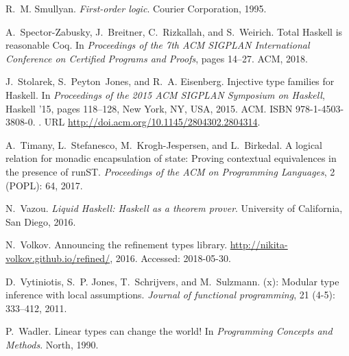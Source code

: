 \documentclass[format=sigplan, review=false, screen=true, 10pt]{acmart}
\begin{document}
\begin{thebibliography}{22}
R.~M. Smullyan.
\newblock \emph{First-order logic}.
\newblock Courier Corporation, 1995.



A.~Spector-Zabusky, J.~Breitner, C.~Rizkallah, and S.~Weirich.
\newblock Total {Haskell} is reasonable {Coq}.
\newblock In \emph{Proceedings of the 7th ACM SIGPLAN International Conference
  on Certified Programs and Proofs}, pages 14--27. ACM, 2018.


J.~Stolarek, S.~Peyton~Jones, and R.~A. Eisenberg.
\newblock Injective type families for {Haskell}.
\newblock In \emph{Proceedings of the 2015 ACM SIGPLAN Symposium on Haskell},
  Haskell '15, pages 118--128, New York, NY, USA, 2015. ACM.
\newblock ISBN 978-1-4503-3808-0.
\newblock {}.
\newblock URL \url{http://doi.acm.org/10.1145/2804302.2804314}.

A.~Timany, L.~Stefanesco, M.~Krogh-Jespersen, and L.~Birkedal.
\newblock A logical relation for monadic encapsulation of state: Proving
  contextual equivalences in the presence of {runST}.
\newblock \emph{Proceedings of the ACM on Programming Languages}, 2
  (POPL): 64, 2017.

N.~Vazou.
\newblock \emph{Liquid Haskell: Haskell as a theorem prover}.
\newblock University of California, San Diego, 2016.

N.~Volkov.
\newblock Announcing the refinement types library.
\newblock \url{http://nikita-volkov.github.io/refined/}, 2016.
\newblock Accessed: 2018-05-30.

D.~Vytiniotis, S.~P. Jones, T.~Schrijvers, and M.~Sulzmann.
(x): Modular type inference with local assumptions.
\newblock \emph{Journal of functional programming}, 21 (4-5):
  333--412, 2011.

P.~Wadler.
\newblock Linear types can change the world!
\newblock In \emph{Programming Concepts and Methods}. North, 1990.

\end{thebibliography}
\end{document}
